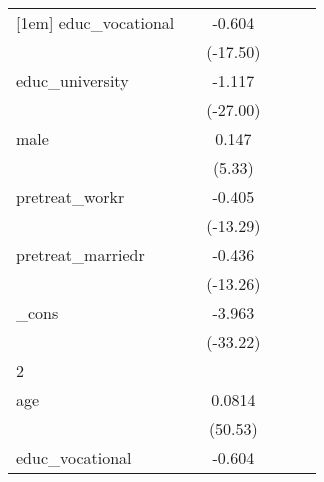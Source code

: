 {\begin{tabular}{l*{5}{c}}
[1em]
educ\_vocational&                     &      -0.604\sym{***}&                     &                     &                     \\
            &                     &    (-17.50)         &                     &                     &                     \\
[1em]
educ\_university&                     &      -1.117\sym{***}&                     &                     &                     \\
            &                     &    (-27.00)         &                     &                     &                     \\
[1em]
male        &                     &       0.147\sym{***}&                     &                     &                     \\
            &                     &      (5.33)         &                     &                     &                     \\
[1em]
pretreat\_workr&                     &      -0.405\sym{***}&                     &                     &                     \\
            &                     &    (-13.29)         &                     &                     &                     \\
[1em]
pretreat\_marriedr&                     &      -0.436\sym{***}&                     &                     &                     \\
            &                     &    (-13.26)         &                     &                     &                     \\
[1em]
\_cons      &                     &      -3.963\sym{***}&                     &                     &                     \\
            &                     &    (-33.22)         &                     &                     &                     \\
\hline
2           &                     &                     &                     &                     &                     \\
age         &                     &      0.0814\sym{***}&                     &                     &                     \\
            &                     &     (50.53)         &                     &                     &                     \\
[1em]
educ\_vocational&                     &      -0.604\sym{***}&                     &                     &                     \\

\end{tabular}}
